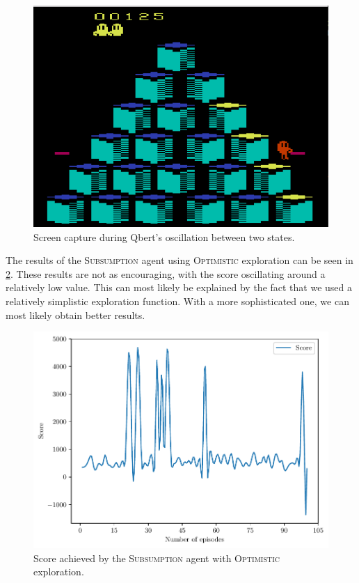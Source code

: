 \documentclass[a4paper,titlepage]{article}
\begin{document}
	\begin{figure}[!htb]
		\centering
		\includegraphics[width=\columnwidth]{screenshots/random_oscillations_2.png}
		\caption
		{Screen capture during Qbert's oscillation between two states.}
		\label{fig:random_oscillations}
	\end{figure}

	The results of the \textsc{Subsumption} agent using \textsc{Optimistic} exploration can be seen in \cref{fig:subsumption_optimistic}. These results are not as encouraging, with the score oscillating around a relatively low value. This can most likely be explained by the fact that we used a relatively simplistic exploration function. With a more sophisticated one, we can most likely obtain better results.
	
	\begin{figure}[!htb]
		\centering
		\includegraphics[width=\columnwidth]{plots/subsumption_optimistic.pdf}
		\caption
		{Score achieved by the \textsc{Subsumption} agent with \textsc{Optimistic} exploration.}
		\label{fig:subsumption_optimistic}
	\end{figure}
	
\end{document}
